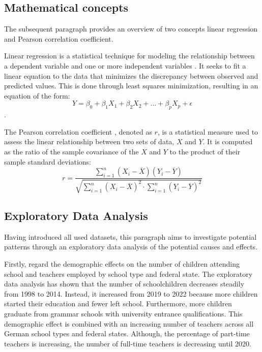 \subsection{Mathematical concepts}
The subsequent paragraph provides an overview of two concepts linear regression and Pearson correlation coefficient.

Linear regression is a statistical technique for modeling the relationship between a dependent variable and one or more independent variables \cite[p.~71]{james_introduction_2021}. It seeks to fit a linear equation to the data that minimizes the discrepancy between observed and predicted values. This is done through least squares minimization, resulting in an equation of the form:
\begin{equation}
    Y = \beta_0 + \beta_1 X_1 + \beta_2 X_2 +  ...+ \beta_p X_p + \epsilon 
\end{equation}.

The Pearson correlation coefficient \cite{rodgers_thirteen_1988}, denoted as $r$, is a statistical measure used to assess the linear relationship between two sets of data, $X$ and $Y$. It is computed as the ratio of the sample covariance of the $X$ and $Y$ to the product of their sample standard deviations:
\begin{equation}
    r = \frac{\sum_{i=1}^n (X_i - \overline{X}) (Y_i - \overline{Y})}{\sqrt{\sum_{i=1}^n(X_i-\overline{X})^2 \cdot \sum_{i=1}^n(Y_i-\overline{Y})^2}}
\end{equation}


\subsection{Exploratory Data Analysis}

Having introduced all used datasets, this paragraph aims to investigate potential patterns through an exploratory data analysis of the potential causes and effects. 

Firstly, regard the demographic effects on the number of children attending school and teachers employed by school type and federal state. The exploratory data analysis has shown that the number of schoolchildren decreases steadily from 1998 to 2014. Instead, it increased from 2019 to 2022 because more children started their education and fewer left school. Furthermore, more children graduate from grammar schools with university entrance qualifications. This demographic effect is combined with an increasing number of teachers across all German school types and federal states. Although, the percentage of part-time teachers is increasing, the number of full-time teachers is decreasing until 2020.

